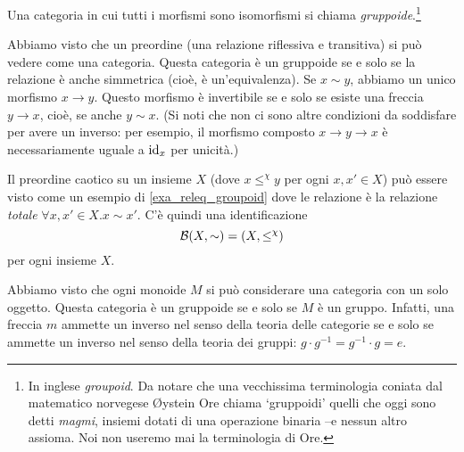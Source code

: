 \begin{definition}[Gruppoide]\label{def_gruppoide}
	Una categoria in cui tutti i morfismi sono isomorfismi si chiama \emph{gruppoide}.\footnote{In inglese \emph{groupoid}. Da notare che una vecchissima terminologia coniata dal matematico norvegese Øystein Ore chiama `gruppoidi' quelli che oggi sono detti \emph{magmi}, insiemi dotati di una operazione binaria --e nessun altro assioma. Noi non useremo mai la terminologia di Ore.}
\end{definition}
\begin{example}\label{exa_releq_groupoid}
	Abbiamo visto che un preordine (una relazione riflessiva e transitiva) si può vedere come una categoria. Questa categoria è un gruppoide se e solo se la relazione è anche simmetrica (cioè, è un'equivalenza). Se \(x\sim y\), abbiamo un unico morfismo \(x\to y\). Questo morfismo è invertibile se e solo se esiste una freccia \(y\to x\), cioè, se anche \(y\sim x\). (Si noti che non ci sono altre condizioni da soddisfare per avere un inverso: per esempio, il morfismo composto \(x\to y\to x\) è necessariamente uguale a \(\mathrm{id}_x\) per unicità.)
\end{example}
\begin{remark}
	Il preordine caotico su un insieme \(X\) (dove \(x\mathrel{\le^\chi} y\) per ogni \(x,x'\in X\)) può essere visto come un esempio di \ref{exa_releq_groupoid} dove le relazione è la relazione \emph{totale} \(\forall x,x'\in X.x\sim x'\). C'è quindi una identificazione
	\[\mathcal{B}(X,\sim) = (X,\le^\chi)\]
	per ogni insieme \(X\).
\end{remark}
\begin{example}\label{exa_grp_groupoid}
	Abbiamo visto che ogni monoide \(M\) si può considerare una categoria con un solo oggetto. Questa categoria è un gruppoide se e solo se \(M\) è un gruppo. Infatti, una freccia \(m\) ammette un inverso nel senso della teoria delle categorie se e solo se ammette un inverso nel senso della teoria dei gruppi: \(g\cdot g^{-1}=g^{-1}\cdot g = e\).
\end{example}
